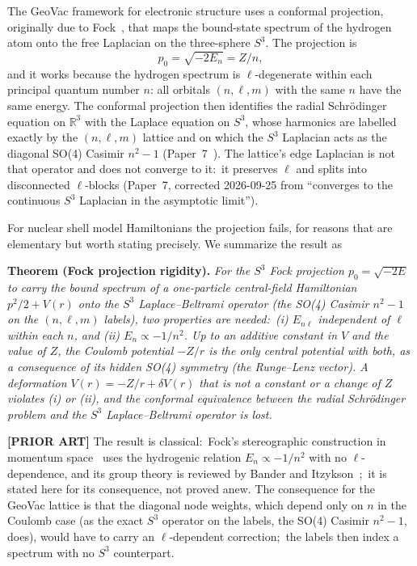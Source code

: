 \documentclass[twocolumn,prc,amsmath,amssymb,superscriptaddress]{revtex4-2}
\begin{document}
The GeoVac framework for electronic structure uses a conformal
projection, originally due to Fock~\cite{Fock1935}, that maps the
bound-state spectrum of the hydrogen atom onto the free Laplacian on
the three-sphere $S^3$. The projection is
\[
  p_0 = \sqrt{-2 E_n} = Z/n ,
\]
and it works because the hydrogen spectrum is $\ell$-degenerate within
each principal quantum number $n$: all orbitals $(n,\ell,m)$ with the
same $n$ have the same energy. The conformal projection then identifies
the radial Schr\"odinger equation on $\mathbb{R}^3$ with the Laplace
equation on $S^3$, whose harmonics are labelled exactly by the
$(n,\ell,m)$ lattice and on which the $S^3$ Laplacian acts as the
diagonal SO(4) Casimir $n^2-1$ (Paper~7~\cite{Paper7}).  The lattice's
edge Laplacian is not that operator and does not converge to it:\ it
preserves $\ell$ and splits into disconnected $\ell$-blocks (Paper~7,
corrected 2026-09-25 from ``converges to the continuous $S^3$ Laplacian
in the asymptotic limit'').

For nuclear shell model Hamiltonians the projection fails, for reasons
that are elementary but worth stating precisely. We summarize the
result as

\textbf{Theorem (Fock projection rigidity).}
\emph{For the $S^3$ Fock projection $p_0 = \sqrt{-2 E}$ to carry the
bound spectrum of a one-particle central-field Hamiltonian
$p^2/2 + V(r)$ onto the $S^3$ Laplace--Beltrami operator (the SO(4)
Casimir $n^2 - 1$ on the $(n,\ell,m)$ labels), two properties are
needed:\ (i) $E_{n\ell}$ independent of $\ell$ within each $n$, and
(ii) $E_n \propto -1/n^2$. Up to an additive constant in $V$ and the
value of $Z$, the Coulomb potential $-Z/r$ is the only central
potential with both, as a consequence of its hidden SO(4) symmetry
(the Runge--Lenz vector). A deformation
$V(r) = -Z/r + \delta V(r)$ that is not a constant or a change of $Z$
violates (i) or (ii), and the conformal equivalence between the
radial Schr\"odinger problem and the $S^3$ Laplace--Beltrami operator
is lost.}

\textbf{[PRIOR ART]} The result is classical:\ Fock's stereographic
construction in momentum space~\cite{Fock1935} uses the hydrogenic
relation $E_n \propto -1/n^2$ with no $\ell$-dependence, and its group
theory is reviewed by Bander and Itzykson~\cite{Bander1966};\ it is
stated here for its consequence, not proved anew. The consequence for
the GeoVac lattice is
that the diagonal node weights, which depend only on $n$ in the Coulomb
case (as the exact $S^3$ operator on the labels, the SO(4) Casimir
$n^2-1$, does), would have to carry an $\ell$-dependent correction;\ the
labels then index a spectrum with no $S^3$ counterpart.
\end{document}
